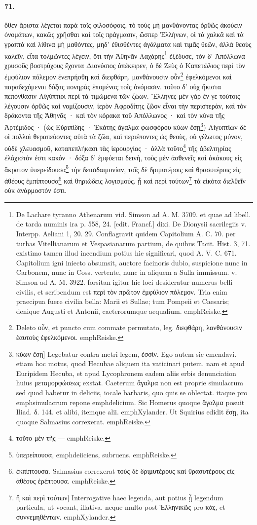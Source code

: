 \documentclass[a4paper, 11pt, oneside, polutonikogreek, german]{article}
\begin{document}
\paragraph{71.}
ὅθεν ἄριστα λέγεται παρὰ τοῖς φιλοσόφοις, τὸ τοὺς μὴ μανθάνοντας ὀρθῶς ἀκούειν ὀνομάτων, κακῶς χρῆσθαι καὶ τοῖς πράγμασιν, ὥσπερ Ἑλλήνων, οἱ τὰ χαλκᾶ καὶ τὰ γραπτὰ καὶ λίθινα μὴ μαθόντες, μηδ' ἐθισθέντες ἀγάλματα καὶ τιμᾶς θεῶν, ἀλλὰ θεοὺς καλεῖν, εἶτα τολμῶντες λέγειν, ὅτι τὴν Ἀθηνᾶν Λαχάρης\footnote{De Lachare tyranno Athenarum vid. Simson ad A. M. 3709. et quae ad libell. de tarda numinis ira p. 558, 24. [edit. Francf.] dixi. De Dionysii sacrilegiis v. Interpp. Aeliani 1, 20. 29. Conflagravit quidem Capitolium A. C. 70. per turbas Vitellianarum et Vespasianarum partium, de quibus Tacit. Hist. 3, 71. existimo tamen illud incendium potius hic significari, quod A. V. C. 671. Capitolium igni iniecto absumsit, auctore facinoris dubio, suspicione nunc in Carbonem, nunc in Coss. vertente, nunc in aliquem a Sulla immissum. v. Simson ad A. M. 3922. forsitan igitur hic loci desideratur numerus belli civilis, et scribendum est περὶ τὸν πρῶτον ἐμφύλιον πόλεμον. Tria enim praecipua fuere civilia bella: Marii et Sullae; tum Pompeii et Caesaris; denique Augusti et Antonii, caeterorumque aequalium. emph{Reiske.}} ἐξέδυσε, τὸν δ' Ἀπόλλωνα χρυσοῦς βοστρύχους ἔχοντα Διονύσιος ἀπέκειρεν, ὁ δὲ Ζεὺς ὁ Καπετώλιος περὶ τὸν ἐμφύλιον πόλεμον ἐνεπρήσθη καὶ διεφθάρη. μανθάνουσιν οὖν\footnote{Deleto οὖν, et puncto cum commate permutato, leg. διεφθάρη, λανθάνουσιν ἑαυτοὺς ἐφελκόμενοι. emph{Reiske.}} ἐφελκόμενοι καὶ παραδεχόμενοι δόξας πονηρὰς ἑπομένας τοῖς ὀνόμασιν. τοῦτο δ' οὐχ ἥκιστα πεπόνθασιν Αἰγύπτιοι περὶ τὰ τιμώμενα τῶν ζώων. Ἕλληνες μὲν γὰρ ἔν γε τούτοις λέγουσιν ὀρθῶς καὶ νομίζουσιν, ἱερὸν Ἀφροδίτης ζῶον εἶναι τὴν περιστερὰν, καὶ τὸν δράκοντα τῆς Ἀθηνᾶς · καὶ τὸν κόρακα τοῦ Ἀπόλλωνος · καὶ τὸν κύνα τῆς Ἀρτέμιδος · (ὡς Εὐριπίδης · Ἑκάτης ἄγαλμα φωσφόρου κύων ἔσῃ\footnote{κύων ἔσῃ] Legebatur contra metri legem, ἐσσίν. Ego autem sic emendavi. etiam hoc motus, quod Hecubae aliquem ita vaticinari putem. nam et apud Euripidem Hecuba, et apud Lycophronem eadem aliis erbis denunciation huius μεταμορφώσεως exstat. Caeterum ἄγαλμα non est proprie simulacrum sed quod habetur in deliciis, iocale barbaris, quo quis se oblectat. itaque pro emph{simulacrum} repone emph{delicium}. Sic Homerus quoque ἄγαλμα posuit Iliad. δ. 144. et alibi, itemque alii. emph{Xylander.} Ut Squirius edidit ἔσῃ, ita quoque Salmasius correxerat. emph{Reiske.}}) Αἰγυπτίων δὲ οἱ πολλοὶ θεραπεύοντες αὐτὰ τὰ ζῶα, καὶ περιέποντες ὡς θεοὺς, οὐ γέλωτος μόνον, οὐδὲ χλευασμοῦ, καταπεπλήκασι τὰς ἱερουργίας · ἀλλὰ τοῦτο\footnote{τοῦτο μὲν τῆς --- emph{Reiske.}} τῆς ἀβελτηρίας ἐλάχιστόν ἐστι κακόν · δόξα δ' ἐμφύεται δεινὴ, τοὺς μὲν ἀσθενεῖς καὶ ἀκάκους εἰς ἄκρατον ὑπερείδουσα\footnote{ὑπερείπουσα, emph{deiiciens, subruens.} emph{Reiske.}} τὴν δεισιδαιμονίαν, τοῖς δὲ δριμυτέροις καὶ θρασυτέροις εἰς ἀθέους ἐμπίπτουσα\footnote{ἐκπίπτουσα. Salmasius correxerat τοὺς δὲ δριμυτέρους καὶ θρασυτέρους εἰς ἀθέους ἐρέπτουσα. emph{Reiske.}} καὶ θηριώδεις λογισμούς. ᾗ καὶ περὶ τούτων\footnote{ἢ καὶ περὶ τούτων] Interrogative haec legenda, aut potius ᾗ legendum particula, ut vocant, illativa. neque multo post Ἑλληνικῶς pro κὰς, et συννεμηθέντων. emph{Xylander.}} τὰ εἰκότα διελθεῖν οὐκ ἀνάρμοστόν ἐστι.
\end{document}
